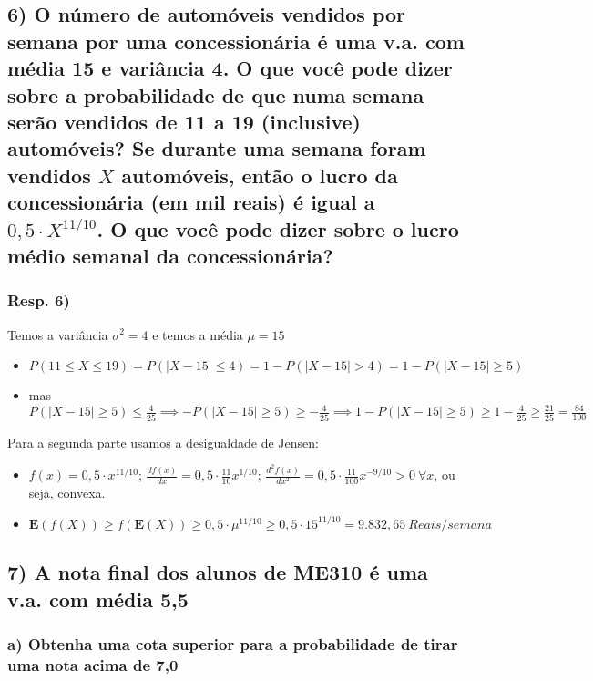 \documentclass[portuguese]{article}
\begin{document}
\subsection*{\textmd{6) O número de automóveis vendidos por semana por uma concessionária
é uma v.a. com média 15 e variância 4. O que você pode dizer sobre
a probabilidade de que numa semana serão vendidos de 11 a 19 (inclusive)
automóveis? Se durante uma semana foram vendidos $X$ automóveis,
então o lucro da concessionária (em mil reais) é igual a $0,5\cdot X^{11/10}$.
O que você pode dizer sobre o lucro médio semanal da concessionária?}}


\subsubsection*{\textmd{Resp. 6)}}

Temos a variância $\sigma^{2}=4$ e temos a média $\mu=15$
\begin{itemize}
\item $P(11\le X\le19)=P(\left|X-15\right|\le4)=1-P(\left|X-15\right|>4)=1-P(\left|X-15\right|\ge5)$
\item mas $P(\left|X-15\right|\ge5)\le\frac{4}{25}\implies-P(\left|X-15\right|\ge5)\ge-\frac{4}{25}\implies1-P(\left|X-15\right|\ge5)\ge1-\frac{4}{25}\ge\frac{21}{25}=\frac{84}{100}$
\end{itemize}
Para a segunda parte usamos a desigualdade de Jensen:
\begin{itemize}
\item $f(x)=0,5\cdot x^{11/10}$; $\frac{df(x)}{dx}=0,5\cdot\frac{11}{10}x^{1/10}$;
$\frac{d^{2}f(x)}{dx^{2}}=0,5\cdot\frac{11}{100}x^{-9/10}>0\ \forall x$,
ou seja, convexa.
\item $\mathbf{E}(f(X))\ge f(\mathbf{E}(X))\ge0,5\cdot\mu^{11/10}\ge0,5\cdot15^{11/10}=9.832,65\ Reais/semana$
\end{itemize}

\subsection*{\textcompwordmark{}}


\subsection*{\textmd{7) A nota final dos alunos de ME310 é uma v.a. com média
5,5}}


\subsubsection*{\textmd{a) Obtenha uma cota superior para a probabilidade de tirar
uma nota acima de 7,0}}
\end{document}

